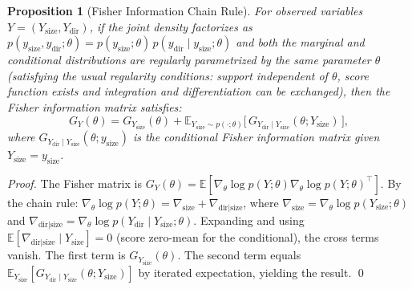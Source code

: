 \documentclass[10pt,a4paper]{amsart}
\newtheorem{proposition}{Proposition}
\newcommand{\E}{\mathbb{E}}
\begin{document}
\begin{proposition}[Fisher Information Chain Rule]\label{prop:fisher-chain}
For observed variables $Y=(Y_{\mathrm{size}},Y_{\mathrm{dir}})$, if the
joint density factorizes as
$p(y_{\mathrm{size}},y_{\mathrm{dir}};\theta)=p(y_{\mathrm{size}};\theta)\,
p(y_{\mathrm{dir}}\mid y_{\mathrm{size}};\theta)$
and both the marginal and conditional distributions are regularly
parametrized by the \emph{same} parameter $\theta$ (satisfying the
usual regularity conditions: support independent of $\theta$, score
function exists and integration and differentiation can be exchanged),
then the Fisher information matrix satisfies:
\begin{equation}\label{eq:fisher-chain}
G_{Y}(\theta) = G_{Y_{\mathrm{size}}}(\theta)
  + \E_{Y_{\mathrm{size}}\sim p(\cdot;\theta)}\!\Big[\,G_{Y_{\mathrm{dir}}\mid Y_{\mathrm{size}}}(\theta;Y_{\mathrm{size}})\,\Big],
\end{equation}
where $G_{Y_{\mathrm{dir}}\mid Y_{\mathrm{size}}}(\theta;y_{\mathrm{size}})$
is the conditional Fisher information matrix given
$Y_{\mathrm{size}}=y_{\mathrm{size}}$.
\end{proposition}

\begin{proof}
The Fisher matrix is
$G_Y(\theta) = \E[\nabla_\theta \log p(Y;\theta)
  \nabla_\theta \log p(Y;\theta)^\top]$.
By the chain rule:
$\nabla_\theta \log p(Y;\theta) = \nabla_{\mathrm{size}} + \nabla_{\mathrm{dir}|\mathrm{size}}$,
where $\nabla_{\mathrm{size}} = \nabla_\theta \log p(Y_{\mathrm{size}};\theta)$
and $\nabla_{\mathrm{dir}|\mathrm{size}} = \nabla_\theta \log p(Y_{\mathrm{dir}}\mid Y_{\mathrm{size}};\theta)$.
Expanding and using $\E[\nabla_{\mathrm{dir}|\mathrm{size}}\mid Y_{\mathrm{size}}]=0$
(score zero-mean for the conditional), the cross terms vanish.
The first term is $G_{Y_{\mathrm{size}}}(\theta)$.
The second term equals
$\E_{Y_{\mathrm{size}}}[G_{Y_{\mathrm{dir}}\mid Y_{\mathrm{size}}}(\theta;Y_{\mathrm{size}})]$
by iterated expectation, yielding the result. \qed
\end{proof}
\end{document}
